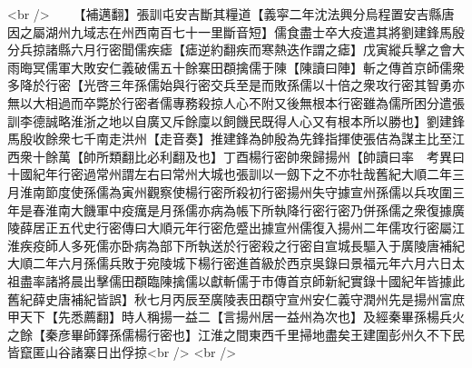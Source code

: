 <br />
　　【補邁翻】張訓屯安吉斷其糧道【義寜二年沈法興分烏程置安吉縣唐因之屬湖州九域志在州西南百七十一里斷音短】儒食盡士卒大疫遣其將劉建鋒馬殷分兵掠諸縣六月行密聞儒疾瘧【瘧逆約翻疾而寒熱迭作謂之瘧】戊寅縱兵擊之會大雨晦冥儒軍大敗安仁義破儒五十餘寨田頵擒儒于陳【陳讀曰陣】斬之傳首京師儒衆多降於行密【光啓三年孫儒始與行密交兵至是而敗孫儒以十倍之衆攻行密其智勇亦無以大相過而卒斃於行密者儒專務殺掠人心不附又後無根本行密雖為儒所困分遣張訓李德誠略淮浙之地以自廣又斥餘廩以飼饑民既得人心又有根本所以勝也】劉建鋒馬殷收餘衆七千南走洪州【走音奏】推建鋒為帥殷為先鋒指揮使張佶為謀主比至江西衆十餘萬【帥所類翻比必利翻及也】丁酉楊行密帥衆歸揚州【帥讀曰率　考異曰十國紀年行密過常州謂左右曰常州大城也張訓以一劔下之不亦牡哉舊紀大順二年三月淮南節度使孫儒為寅州觀察使楊行密所殺初行密揚州失守據宣州孫儒以兵攻圍三年是春淮南大饑軍中疫癘是月孫儒亦病為帳下所執降行密行密乃併孫儒之衆復據廣陵薛居正五代史行密傳曰大順元年行密危蹙出據宣州儒復入揚州二年儒攻行密屬江淮疾疫師人多死儒亦卧病為部下所執送於行密殺之行密自宣城長驅入于廣陵唐補紀大順二年六月孫儒兵敗于宛陵城下楊行密進首級於西京吳錄曰景福元年六月六日太祖盡率諸將晨出擊儒田頵臨陳擒儒以獻斬儒于市傳首京師新紀實錄十國紀年皆據此舊紀薛史唐補紀皆誤】秋七月丙辰至廣陵表田頵守宣州安仁義守潤州先是揚州富庶甲天下【先悉薦翻】時人稱揚一益二【言揚州居一益州為次也】及經秦畢孫楊兵火之餘【秦彦畢師鐸孫儒楊行密也】江淮之間東西千里掃地盡矣王建圍彭州久不下民皆竄匿山谷諸寨日出俘掠<br />
<br />
